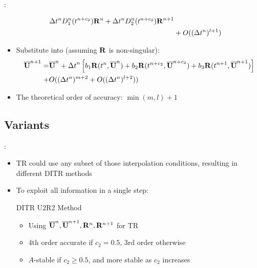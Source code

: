 \documentclass[aspectratio=169,serif]{beamer} %
\begin{document}
\begin{frame}[allowframebreaks]{\secname: \subsecname}
\begin{itemize}
\begin{equation}
\begin{aligned}
              {\Delta} t^n D^n_1(t^{n+c_2})\mathbf{R}^{n} +
              {\Delta} t^n D^n_2(t^{n+c_2})\mathbf{R}^{n + 1}
              \\ & +
              O(({\Delta} t^{n})^{l+1} )
            \end{aligned}
          \end{equation}
    \item Substitute  into  (assuming $\mathbf{R}$ is non-singular):
          \begin{equation}
            \begin{aligned}
              \overline{\mathbf{U}}^{n+1}
              = &
              \overline{\mathbf{U}}^{n} + {{\Delta} t}^{n}
              \left[
                b_1\mathbf{R}(t^n, \overline{\mathbf{U}}^n)
                +
                b_2\mathbf{R}(t^{n+c_2}, \overline{\mathbf{U}}^{n+c_2})
                +
                b_3\mathbf{R}(t^{n+1}, \overline{\mathbf{U}}^{n+1})
                \right]
              \\ + &
              O(({\Delta} t^{n})^{m+2}  + O(({\Delta} t^{n})^{l+2} ))
            \end{aligned}
            \label{eq:fullLTE}
          \end{equation}
    \item The theoretical order of accuracy: $\min(m,l) + 1$
  \end{itemize}
\end{frame}


\subsection{Variants}

\begin{frame}{\secname: \subsecname}
  \begin{itemize}
    \item TR  could use any subset of those interpolation conditions,
          resulting in different DITR methods
    \item To exploit all information in a single step:
          \begin{block}{DITR U2R2 Method}
            \begin{itemize}
              \item Using $\overline{\mathbf{U}}^{n},\overline{\mathbf{U}}^{n+1},\mathbf{R}^{n},\mathbf{R}^{n+1}$ for TR
              \item 4th order accurate if $c_2=0.5$, 3rd order otherwise
              \item $A$-stable if $c_2 \geq 0.5$, and more stable as $c_2$ increases
            \end{itemize}
          \end{block}
  \end{itemize}
\end{frame}
\end{document}
